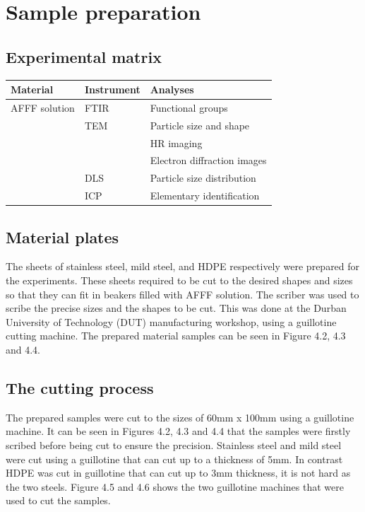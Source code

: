 \documentclass[12pt]{report}
\begin{document}
\section{Sample preparation}
\subsection{Experimental matrix}


\begin{center}    
\begin{tabular}{m{} m{} m{}}
\hline
Material & Instrument & Analyses \\
\hline
AFFF solution & FTIR & Functional groups \\
& TEM & Particle size and shape \\
& & HR imaging \\
& & Electron diffraction images \\
& DLS & Particle size distribution \\
& ICP & Elementary identification \\
\hline
\end{tabular}
\end{center}

\subsection{Material plates} 
The sheets of stainless steel, mild steel, and HDPE respectively were prepared for the experiments. These sheets required to be cut to the desired shapes and sizes so that they can fit in beakers filled with AFFF solution. The scriber was used to scribe the precise sizes and the shapes to be cut. This was done at the Durban University of Technology (DUT) manufacturing workshop, using a guillotine cutting machine. The prepared material samples can be seen in Figure 4.2, 4.3 and 4.4.
 
 
 

\subsection{The cutting process}
The prepared samples were cut to the sizes of 60mm x 100mm using a guillotine machine. It can be seen in Figures 4.2, 4.3 and 4.4 that the samples were firstly scribed before being cut to ensure the precision. Stainless steel and mild steel were cut using a guillotine that can cut up to a thickness of 5mm. In contrast HDPE was cut in guillotine that can cut up to 3mm thickness, it is not hard as the two steels. Figure 4.5 and 4.6 shows the two guillotine machines that were used to cut the samples.
 
\end{document}
